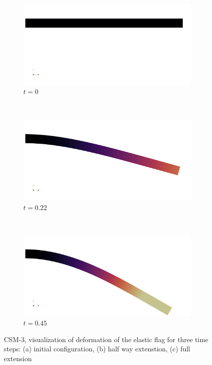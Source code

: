 \newpage
\begin{figure}
    \centering
    \begin{subfigure}[b]{0.3\textwidth}
        \includegraphics[width=\textwidth]{./Fig/csm3_1.png}
       \caption{$t = 0$}
        \label{fig:gull}
    \end{subfigure}
    ~ %
    \begin{subfigure}[b]{0.3\textwidth}
        \includegraphics[width=\textwidth]{./Fig/csm3_2.png}
               \caption{$t = 0.22$}
        \label{fig:tiger}
    \end{subfigure}
    ~ %
    \begin{subfigure}[b]{0.3\textwidth}
        \includegraphics[width=\textwidth]{./Fig/csm3_3.png}
        \caption{$t = 0.45$}
        \label{fig:mouse}
    \end{subfigure}
    \caption{CSM-3, visualization of deformation of the elastic flag for three time steps: (a) initial configuration, (b) half way extenstion, (c) full extension }
 \label{fig:bender}
\end{figure}

